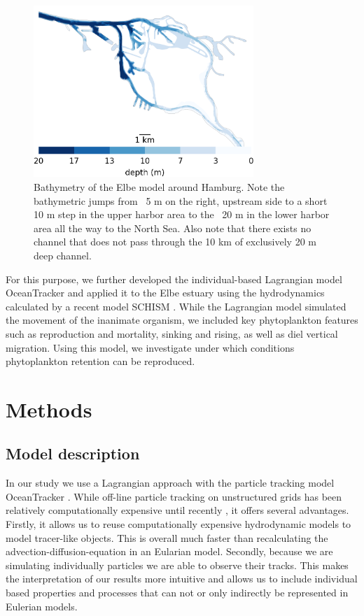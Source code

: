 \documentclass[npg, manuscript]{copernicus}
\begin{document}
\begin{figure}
    \includegraphics[width=8.3cm]{harbor_small.png}
    \caption{Bathymetry of the Elbe model around Hamburg. Note the bathymetric jumps from ~5 \unit{m} on the right, upstream side to a short 10 \unit{m} step in the upper harbor area to the ~20 \unit{m} in the lower harbor area all the way to the North Sea. Also note that there exists no channel that does not pass through the 10 \unit{km} of exclusively 20 \unit{m} deep channel.}
    \label{fig:bathymetry}
\end{figure}

For this purpose, we further developed the individual-based Lagrangian model OceanTracker \citep{Vennell2021} and applied it to the Elbe estuary using the hydrodynamics calculated by a recent model SCHISM \citep{Pein2021}.
While the Lagrangian model simulated the movement of the inanimate organism, we included key phytoplankton features such as reproduction and mortality, sinking and rising, as well as diel vertical migration. %
Using this model, we investigate under which conditions phytoplankton retention can be reproduced.

\section{Methods}

\subsection{Model description}

In our study we use a Lagrangian approach with the particle tracking model OceanTracker \citep{Vennell2021}.
While off-line particle tracking on unstructured grids has been relatively computationally expensive until recently \citep{Vennell2021}, it offers several advantages.
Firstly, it allows us to reuse computationally expensive hydrodynamic models to model tracer-like objects.
This is overall much faster than recalculating the advection-diffusion-equation in an Eularian model.
Secondly, because we are simulating individually particles we are able to observe their tracks.
This makes the interpretation of our results more intuitive and allows us to include individual based properties and processes that can not or only indirectly be represented in Eulerian models.
\end{document}
